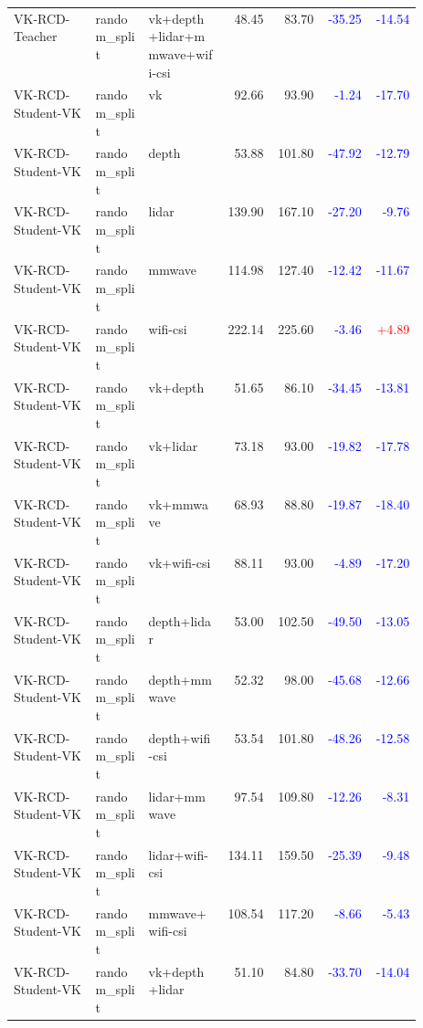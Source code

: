\begin{longtable}{p{0.20\linewidth}p{0.13\linewidth}p{0.19\linewidth}rrrr}
VK-RCD-Teacher & random\_split & vk+depth+lidar+mmwave+wifi-csi & 48.45 & 83.70 & \textcolor{blue}{-35.25} & \textcolor{blue}{-14.54}\\
VK-RCD-Student-VK & random\_split & vk & 92.66 & 93.90 & \textcolor{blue}{-1.24} & \textcolor{blue}{-17.70}\\
VK-RCD-Student-VK & random\_split & depth & 53.88 & 101.80 & \textcolor{blue}{-47.92} & \textcolor{blue}{-12.79}\\
VK-RCD-Student-VK & random\_split & lidar & 139.90 & 167.10 & \textcolor{blue}{-27.20} & \textcolor{blue}{-9.76}\\
VK-RCD-Student-VK & random\_split & mmwave & 114.98 & 127.40 & \textcolor{blue}{-12.42} & \textcolor{blue}{-11.67}\\
VK-RCD-Student-VK & random\_split & wifi-csi & 222.14 & 225.60 & \textcolor{blue}{-3.46} & \textcolor{red}{+4.89}\\
VK-RCD-Student-VK & random\_split & vk+depth & 51.65 & 86.10 & \textcolor{blue}{-34.45} & \textcolor{blue}{-13.81}\\
VK-RCD-Student-VK & random\_split & vk+lidar & 73.18 & 93.00 & \textcolor{blue}{-19.82} & \textcolor{blue}{-17.78}\\
VK-RCD-Student-VK & random\_split & vk+mmwave & 68.93 & 88.80 & \textcolor{blue}{-19.87} & \textcolor{blue}{-18.40}\\
VK-RCD-Student-VK & random\_split & vk+wifi-csi & 88.11 & 93.00 & \textcolor{blue}{-4.89} & \textcolor{blue}{-17.20}\\
VK-RCD-Student-VK & random\_split & depth+lidar & 53.00 & 102.50 & \textcolor{blue}{-49.50} & \textcolor{blue}{-13.05}\\
VK-RCD-Student-VK & random\_split & depth+mmwave & 52.32 & 98.00 & \textcolor{blue}{-45.68} & \textcolor{blue}{-12.66}\\
VK-RCD-Student-VK & random\_split & depth+wifi-csi & 53.54 & 101.80 & \textcolor{blue}{-48.26} & \textcolor{blue}{-12.58}\\
VK-RCD-Student-VK & random\_split & lidar+mmwave & 97.54 & 109.80 & \textcolor{blue}{-12.26} & \textcolor{blue}{-8.31}\\
VK-RCD-Student-VK & random\_split & lidar+wifi-csi & 134.11 & 159.50 & \textcolor{blue}{-25.39} & \textcolor{blue}{-9.48}\\
VK-RCD-Student-VK & random\_split & mmwave+wifi-csi & 108.54 & 117.20 & \textcolor{blue}{-8.66} & \textcolor{blue}{-5.43}\\
VK-RCD-Student-VK & random\_split & vk+depth+lidar & 51.10 & 84.80 & \textcolor{blue}{-33.70} & \textcolor{blue}{-14.04}\\

\end{longtable}
